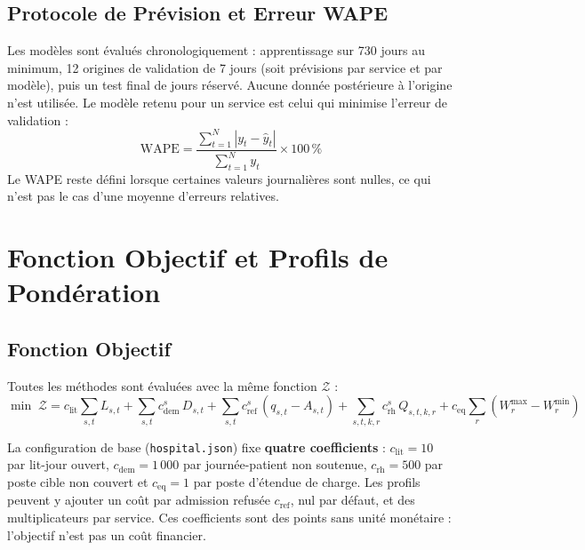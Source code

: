 

\subsection{Protocole de Prévision et Erreur WAPE}
Les modèles sont évalués chronologiquement : apprentissage sur 730 jours au minimum, 12 origines de validation de 7 jours (soit \NbPrevVal{} prévisions par service et par modèle), puis un test final de \NbPrevTest{} jours réservé. Aucune donnée postérieure à l'origine n'est utilisée. Le modèle retenu pour un service est celui qui minimise l'erreur de validation :
\begin{equation}
    \text{WAPE} = \frac{\sum_{t=1}^{N} |y_t - \hat{y}_t|}{\sum_{t=1}^{N} y_t} \times 100\,\%
\end{equation}
Le WAPE reste défini lorsque certaines valeurs journalières sont nulles, ce qui n'est pas le cas d'une moyenne d'erreurs relatives.

\section{Fonction Objectif et Profils de Pondération}

\subsection{Fonction Objectif}
Toutes les méthodes sont évaluées avec la même fonction $\mathcal{Z}$ :
\begin{equation}
    \min \; \mathcal{Z} = c_{\text{lit}} \sum_{s,t} L_{s,t}
    + \sum_{s,t} c^{s}_{\text{dem}} \, D_{s,t}
    + \sum_{s,t} c^{s}_{\text{ref}} \, (q_{s,t} - A_{s,t})
    + \sum_{s,t,k,r} c^{s}_{\text{rh}} \, Q_{s,t,k,r}
    + c_{\text{eq}} \sum_{r} \left(W^{\max}_r - W^{\min}_r\right)
    \label{eq:objectif}
\end{equation}

La configuration de base (\texttt{hospital.json}) fixe \textbf{quatre coefficients} : $c_{\text{lit}} = 10$ par lit-jour ouvert, $c_{\text{dem}} = 1\,000$ par journée-patient non soutenue, $c_{\text{rh}} = 500$ par poste cible non couvert et $c_{\text{eq}} = 1$ par poste d'étendue de charge. Les profils peuvent y ajouter un coût par admission refusée $c_{\text{ref}}$, nul par défaut, et des multiplicateurs par service. Ces coefficients sont des points sans unité monétaire : l'objectif n'est pas un coût financier.

